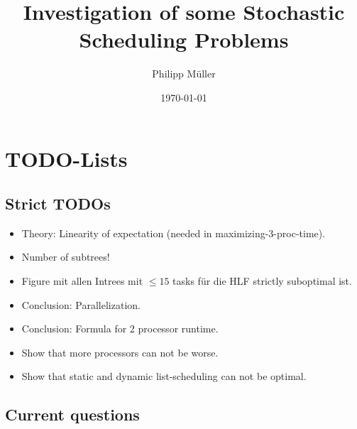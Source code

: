 \documentclass[a4paper, 10pt, oneside]{book}
\title{Investigation of some Stochastic Scheduling Problems}
\author{Philipp Müller}
\date{\today}
\begin{document}
\frontmatter
% 
% 
% 

\mainmatter

\chapter{TODO-Lists}
\label{chap:todo}

\section{Strict TODOs}
\label{sec:strict-todos}

\begin{itemize}
\item Theory: Linearity of expectation (needed in maximizing-3-proc-time).
\item Number of subtrees!
\item Figure mit allen Intrees mit $\leq 15$ tasks für die HLF strictly suboptimal ist.
\item Conclusion: Parallelization.
\item Conclusion: Formula for 2 processor runtime.
\item Show that more processors can not be worse.
\item Show that static and dynamic list-scheduling can not be optimal.\done{}
\end{itemize}

\section{Current questions}
\label{chap:current-questions}
\end{document}
